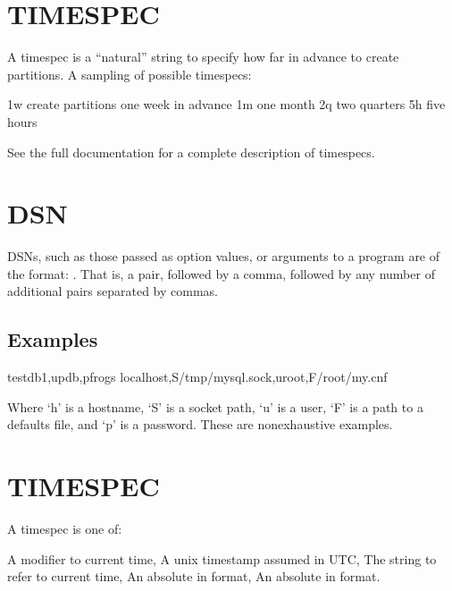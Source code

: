 \documentclass[letterpaper,10pt,english]{sphinxmanual}
\begin{document}
\section{TIMESPEC}
\label{\detokenize{mariadb-parted-fat:timespec}}
A timespec is a “natural” string to specify how far in advance to create
partitions. A sampling of possible timespecs:

\begin{sphinxVerbatim}[commandchars=\\\{\}]
1w create partitions one week in advance
1m one month
2q two quarters
5h five hours
\end{sphinxVerbatim}

See the full documentation for a complete description of timespecs.


\section{DSN}
\label{\detokenize{mariadb-parted-fat:dsn}}
DSNs, such as those passed as option values, or arguments to a program
are of the format: . That is, a  pair, followed
by a comma, followed by any number of additional  pairs separated by
commas.


\subsection{Examples}
\label{\detokenize{mariadb-parted-fat:id1}}
\begin{sphinxVerbatim}[commandchars=\\\{\}]
testdb1,updb,pfrogs
localhost,S/tmp/mysql.sock,uroot,F/root/my.cnf
\end{sphinxVerbatim}

Where ‘h’ is a hostname, ‘S’ is a socket path, ‘u’ is a user, ‘F’ is a path
to a defaults file, and ‘p’ is a password. These are non\sphinxhyphen{}exhaustive examples.


\section{TIMESPEC}
\label{\detokenize{mariadb-parted-fat:id2}}
A timespec is one of:

\begin{sphinxVerbatim}[commandchars=\\\{\}]
A modifier to current  time,
A unix timestamp assumed in UTC,
The string  to refer to current  time,
An absolute  in  format,
An absolute  in  format.
\end{sphinxVerbatim}
\end{document}
